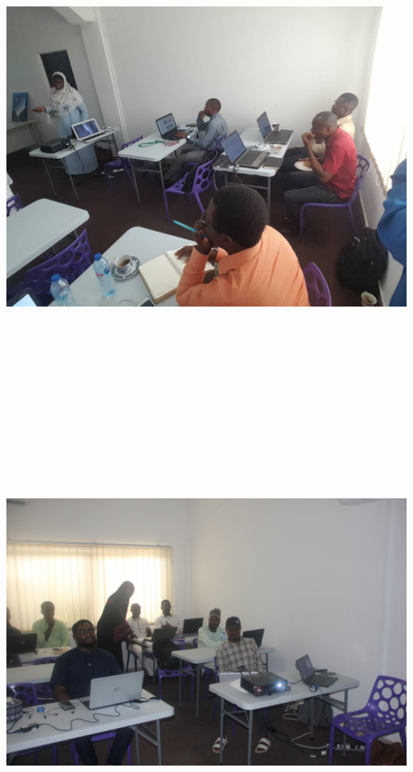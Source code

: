 \documentclass[
  letterpaper,
  DIV=11,
  numbers=noendperiod]{scrartcl}
\begin{document}
\includegraphics[width=5.19792in,height=5.97917in]{images/trainings/pics1.jpeg}

\includegraphics[width=5.19792in,height=5.97917in]{images/trainings/pics2.jpeg}
\end{document}
